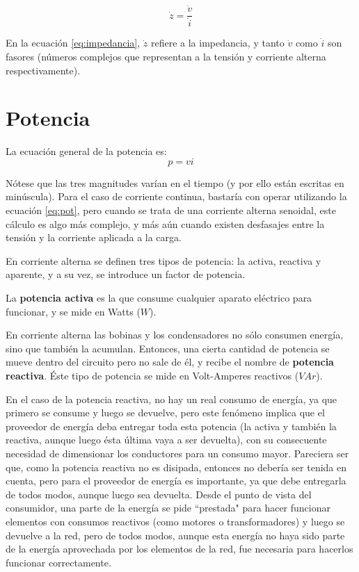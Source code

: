 \begin{equation}
	\label{eq:impedancia}
	\dot{z}=\frac{\dot{v}}{\dot{i}}
\end{equation}

En la ecuación \ref{eq:impedancia}, $\dot{z}$ refiere a la impedancia, y tanto $\dot{v}$ como $\dot{i}$ son fasores (números complejos que representan a la tensión y corriente alterna respectivamente).

\section{Potencia}

La ecuación general de la potencia es: $$ p = vi $$

Nótese que las tres magnitudes varían en el tiempo (y por ello están escritas en minúscula). Para el caso de corriente continua, bastaría con operar utilizando la ecuación  \ref{eq:pot}, pero cuando se trata de una corriente alterna senoidal, este cálculo es algo más complejo, y más aún cuando existen desfasajes entre la tensión y la corriente aplicada a la carga.

En corriente alterna se definen tres tipos de potencia: la activa, reactiva y aparente, y a su vez, se introduce un factor de potencia.

La \textbf{potencia activa} es la que consume cualquier aparato eléctrico para funcionar, y se mide en Watts ($W$).

En corriente alterna las bobinas y los condensadores no sólo consumen energía, sino que también la acumulan. Entonces, una cierta cantidad de potencia se mueve dentro del circuito pero no sale de él, y recibe el nombre de \textbf{potencia reactiva}. Éste tipo de potencia se mide en Volt-Amperes reactivos ($VAr$).

En el caso de la potencia reactiva, no hay un real consumo de energía, ya que primero se consume y luego se devuelve, pero este fenómeno implica que el proveedor de energía deba entregar toda esta potencia (la activa y también la reactiva, aunque luego ésta última vaya a ser devuelta), con su consecuente necesidad de dimensionar los conductores para un consumo mayor. Pareciera ser que, como la potencia reactiva no es disipada, entonces no  debería ser tenida en cuenta, pero para el proveedor de energía es importante, ya que debe entregarla de todos modos, aunque luego sea devuelta. Desde el punto de vista del consumidor, una parte de la energía se pide ``prestada" para hacer funcionar elementos con consumos reactivos (como motores o transformadores) y luego se devuelve a la red, pero de todos modos, aunque esta energía no haya sido parte de la energía aprovechada por los elementos de la red, fue necesaria para hacerlos funcionar correctamente.

